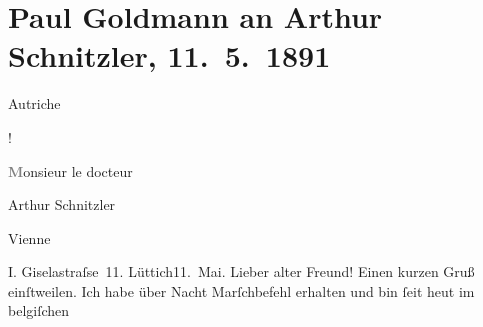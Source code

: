 

         
         \renewcommand{\erwaehntePersonen}{Personen: Clementine Goldmann, Vally Rosengart}
         \renewcommand{\erwaehnteInstitutionen}{Institutionen: Heilsarmee}
         \renewcommand{\erwaehnteOrte}{Orte: Belgien, Brüssel, Bösendorferstraße, Lüttich, Wien, Österreich}
         \renewcommand{\erwaehnteWerke}{}
               \section[Paul Goldmann an Arthur Schnitzler, 11. 5. 1891]{ Paul Goldmann an Arthur Schnitzler, 11. 5. 1891}\nopagebreak{}\rehead{ }\begin{ledgroupsized}[t]{13cm}\normalsize\beginnumbering \toendnotes[C]{\smallbreak\pagebreak[2]} 
\toendnotes[C]{\smallbreak}\pstart{}{\pb}\begin{otherlanguage}{french}Autriche\end{otherlanguage}! \pend{}\pstart{}\begin{otherlanguage}{french}\textcolor{gray}{\textbf{M}}onsieur le docteur\end{otherlanguage} Arthur
                  Schnitzler\pend{}\pstart{}\begin{otherlanguage}{french}Vienne\end{otherlanguage}\pend{}\pstart{}I. Giselastraſse 11. \pend{}{\bigskip}\pstart
           \noindent{}{\pb}Lüttich11. Mai. Lieber alter Freund! Einen
               kurzen Gruß einſtweilen. Ich habe über Nacht Marſchbefehl erhalten und bin ſeit heut im belgiſchen\label{K_L02662-1v}
\end{ledgroupsized}
